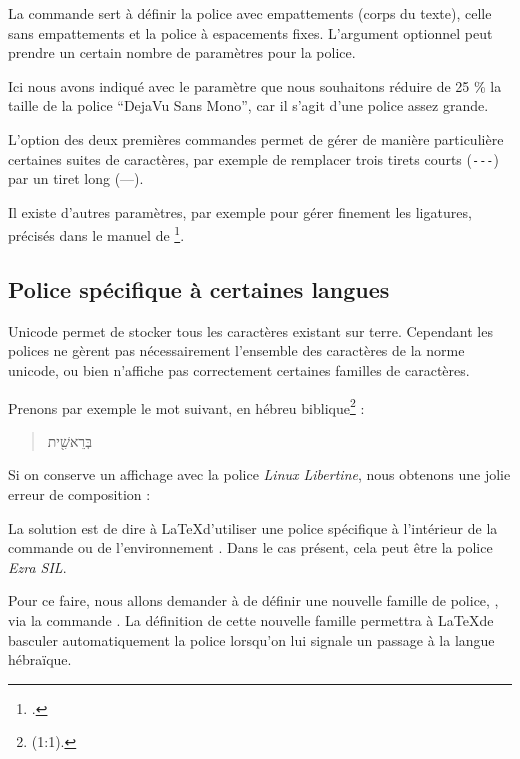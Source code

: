 La commande  sert à définir la police avec empattements (corps du texte),  celle sans empattements et  la police à espacements fixes. L'argument optionnel peut prendre un certain nombre de paramètres pour la police.

Ici nous avons indiqué avec le paramètre  que nous souhaitons réduire de 25 \% la taille de la police \enquote{DejaVu Sans Mono}, car il s'agit d'une police assez grande.

L'option  des deux premières commandes permet de gérer de manière particulière certaines suites de caractères, par exemple de remplacer trois tirets courts (\verb|---|) par un tiret long (---).

Il existe d'autres paramètres, par exemple pour gérer finement les ligatures, précisés dans le manuel de \footcite{fontspec_optionspolices}.

\subsection{Police spécifique à certaines langues}\label{policenonlatine}

Unicode permet de stocker tous les caractères existant sur terre. Cependant les polices ne gèrent pas nécessairement l'ensemble des caractères de la norme unicode, ou bien n'affiche pas correctement certaines familles de caractères.

Prenons par exemple le mot suivant, en hébreu biblique\footnote{(1:1).} :

\begin{quotation}
\texthebrew{בְּרֵאשִׁ֖ית}
\end{quotation}

Si on conserve un affichage avec la police \emph{Linux Libertine}, nous obtenons une jolie erreur de composition :

\begin{quotation}
\texthebrew{}
\end{quotation}

La solution est de dire à \LaTeX d'utiliser une police spécifique à l'intérieur de la commande  ou de  l'environnement . Dans le cas présent, cela peut être la police \emph{Ezra SIL}.

Pour ce faire, nous allons demander à  de définir une nouvelle famille de police, \csp{\hebrewfont}, via la commande . La définition de cette nouvelle famille permettra à \LaTeX de basculer automatiquement la police lorsqu'on lui signale un passage à la langue hébraïque.

